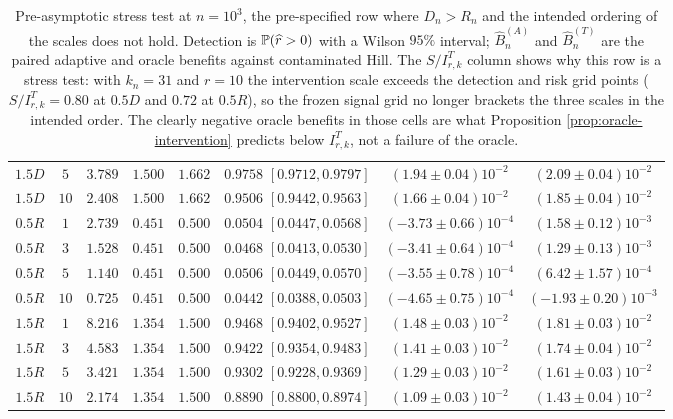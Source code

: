 \begin{table}[t]
\begin{tabular}{cccccccc}
$1.5D$ & $5$ & $3.789$ & $1.500$ & $1.662$ & $0.9758$ $[0.9712,0.9797]$ & $(1.94\pm0.04)10^{-2}$ & $(2.09\pm0.04)10^{-2}$\\
$1.5D$ & $10$ & $2.408$ & $1.500$ & $1.662$ & $0.9506$ $[0.9442,0.9563]$ & $(1.66\pm0.04)10^{-2}$ & $(1.85\pm0.04)10^{-2}$\\
$0.5R$ & $1$ & $2.739$ & $0.451$ & $0.500$ & $0.0504$ $[0.0447,0.0568]$ & $(-3.73\pm0.66)10^{-4}$ & $(1.58\pm0.12)10^{-3}$\\
$0.5R$ & $3$ & $1.528$ & $0.451$ & $0.500$ & $0.0468$ $[0.0413,0.0530]$ & $(-3.41\pm0.64)10^{-4}$ & $(1.29\pm0.13)10^{-3}$\\
$0.5R$ & $5$ & $1.140$ & $0.451$ & $0.500$ & $0.0506$ $[0.0449,0.0570]$ & $(-3.55\pm0.78)10^{-4}$ & $(6.42\pm1.57)10^{-4}$\\
$0.5R$ & $10$ & $0.725$ & $0.451$ & $0.500$ & $0.0442$ $[0.0388,0.0503]$ & $(-4.65\pm0.75)10^{-4}$ & $(-1.93\pm0.20)10^{-3}$\\
$1.5R$ & $1$ & $8.216$ & $1.354$ & $1.500$ & $0.9468$ $[0.9402,0.9527]$ & $(1.48\pm0.03)10^{-2}$ & $(1.81\pm0.03)10^{-2}$\\
$1.5R$ & $3$ & $4.583$ & $1.354$ & $1.500$ & $0.9422$ $[0.9354,0.9483]$ & $(1.41\pm0.03)10^{-2}$ & $(1.74\pm0.04)10^{-2}$\\
$1.5R$ & $5$ & $3.421$ & $1.354$ & $1.500$ & $0.9302$ $[0.9228,0.9369]$ & $(1.29\pm0.03)10^{-2}$ & $(1.61\pm0.03)10^{-2}$\\
$1.5R$ & $10$ & $2.174$ & $1.354$ & $1.500$ & $0.8890$ $[0.8800,0.8974]$ & $(1.09\pm0.03)10^{-2}$ & $(1.43\pm0.04)10^{-2}$\\
\bottomrule
\end{tabular}
\caption{Pre-asymptotic stress test at $n=10^3$, the pre-specified row where $D_n>R_n$ and the intended ordering of the scales does not hold.  Detection is $\mathbb{P}(\widehat r>0)$ with a Wilson $95\%$ interval; $\widehat B_n^{(A)}$ and $\widehat B_n^{(T)}$ are the paired adaptive and oracle benefits against contaminated Hill.  The $S/I^{T}_{r,k}$ column shows why this row is a stress test: with $k_n=31$ and $r=10$ the intervention scale exceeds the detection and risk grid points ($S/I^{T}_{r,k}=0.80$ at $0.5D$ and $0.72$ at $0.5R$), so the frozen signal grid no longer brackets the three scales in the intended order. The clearly negative oracle benefits in those cells are what Proposition \ref{prop:oracle-intervention} predicts below $I^{T}_{r,k}$, not a failure of the oracle.}
\label{tab:stress-n1000}
\end{table}
